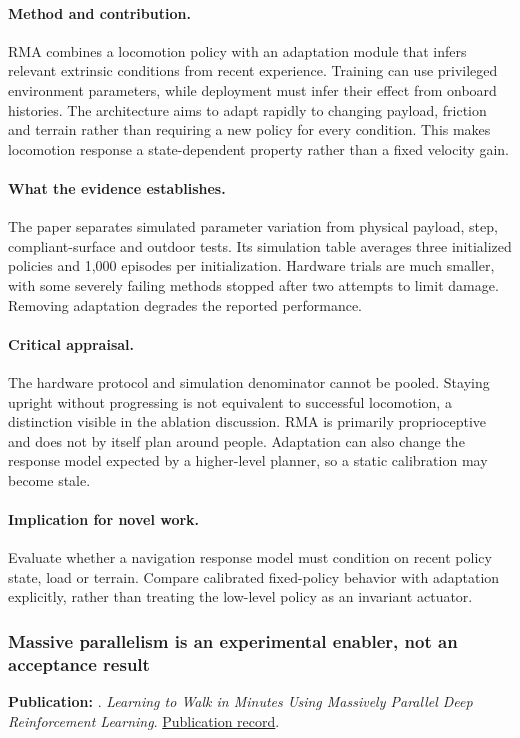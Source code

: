 \paragraph{Method and contribution.} RMA combines a locomotion policy with an adaptation module that infers relevant extrinsic conditions from recent experience. Training can use privileged environment parameters, while deployment must infer their effect from onboard histories. The architecture aims to adapt rapidly to changing payload, friction and terrain rather than requiring a new policy for every condition. This makes locomotion response a state-dependent property rather than a fixed velocity gain.

\paragraph{What the evidence establishes.} The paper separates simulated parameter variation from physical payload, step, compliant-surface and outdoor tests. Its simulation table averages three initialized policies and 1,000 episodes per initialization. Hardware trials are much smaller, with some severely failing methods stopped after two attempts to limit damage. Removing adaptation degrades the reported performance.

\paragraph{Critical appraisal.} The hardware protocol and simulation denominator cannot be pooled. Staying upright without progressing is not equivalent to successful locomotion, a distinction visible in the ablation discussion. RMA is primarily proprioceptive and does not by itself plan around people. Adaptation can also change the response model expected by a higher-level planner, so a static calibration may become stale.

\paragraph{Implication for novel work.} Evaluate whether a navigation response model must condition on recent policy state, load or terrain. Compare calibrated fixed-policy behavior with adaptation explicitly, rather than treating the low-level policy as an invariant actuator.

\subsubsection{Massive parallelism is an experimental enabler, not an acceptance result}\label{paper:rudin}
\textbf{Publication:} \citet{rudin}. \emph{Learning to Walk in Minutes Using Massively Parallel Deep Reinforcement Learning}. \href{https://arxiv.org/abs/2109.11978}{Publication record}.

